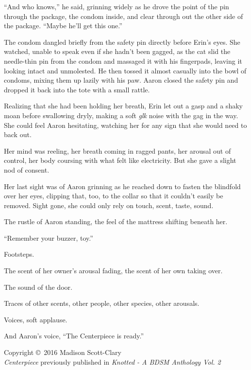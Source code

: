 ``And who knows,'' he said, grinning widely as he drove the point of the pin through the package, the condom inside, and clear through out the other side of the package. ``Maybe he'll get this one.''

The condom dangled briefly from the safety pin directly before Erin's eyes. She watched, unable to speak even if she hadn't been gagged, as the cat slid the needle-thin pin from the condom and massaged it with his fingerpads, leaving it looking intact and unmolested. He then tossed it almost casually into the bowl of condoms, mixing them up lazily with his paw. Aaron closed the safety pin and dropped it back into the tote with a small rattle.

Realizing that she had been holding her breath, Erin let out a gasp and a shaky moan before swallowing dryly, making a soft \emph{glk} noise with the gag in the way. She could feel Aaron hesitating, watching her for any sign that she would need to back out.

Her mind was reeling, her breath coming in ragged pants, her arousal out of control, her body coursing with what felt like electricity. But she gave a slight nod of consent.

Her last sight was of Aaron grinning as he reached down to fasten the blindfold over her eyes, clipping that, too, to the collar so that it couldn't easily be removed. Sight gone, she could only rely on touch, scent, taste, sound.

The rustle of Aaron standing, the feel of the mattress shifting beneath her.

``Remember your buzzer, toy.''

Footsteps.

The scent of her owner's arousal fading, the scent of her own taking over.

The sound of the door.

Traces of other scents, other people, other species, other arousals.

Voices, soft applause.

And Aaron's voice, ``The Centerpiece is ready.''

\vfill

\begin{raggedleft}
{\tiny\DisplayFamily
Copyright \copyright\ 2016 Madison Scott-Clary\\
\emph{Centerpiece} previously published in \emph{Knotted - A BDSM Anthology Vol. 2}}
\end{raggedleft}
